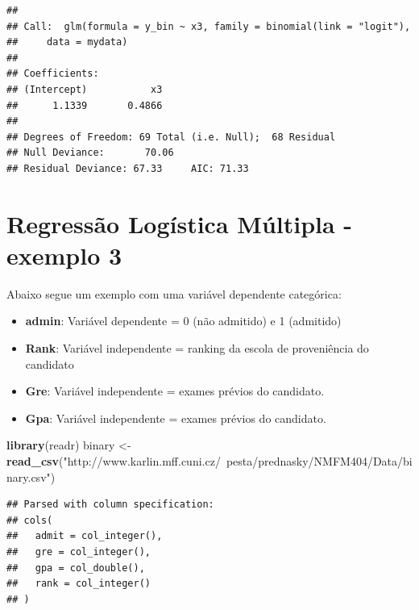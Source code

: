 \documentclass[12pt,brazil,]{book}
\newenvironment{Shaded}{\begin{snugshade}}{\end{snugshade}}
\newcommand{\DataTypeTok}[1]{\textcolor[rgb]{0.13,0.29,0.53}{#1}}
\newcommand{\KeywordTok}[1]{\textcolor[rgb]{0.13,0.29,0.53}{\textbf{#1}}}
\newcommand{\NormalTok}[1]{#1}
\newcommand{\OperatorTok}[1]{\textcolor[rgb]{0.81,0.36,0.00}{\textbf{#1}}}
\newcommand{\StringTok}[1]{\textcolor[rgb]{0.31,0.60,0.02}{#1}}
\providecommand{\tightlist}{%
  \setlength{\itemsep}{0pt}\setlength{\parskip}{0pt}}
\begin{document}
\begin{verbatim}
## 
## Call:  glm(formula = y_bin ~ x3, family = binomial(link = "logit"), 
##     data = mydata)
## 
## Coefficients:
## (Intercept)           x3  
##      1.1339       0.4866  
## 
## Degrees of Freedom: 69 Total (i.e. Null);  68 Residual
## Null Deviance:       70.06 
## Residual Deviance: 67.33     AIC: 71.33
\end{verbatim}

\hypertarget{regressao-logistica-multipla---exemplo-3}{%
\section{Regressão Logística Múltipla - exemplo
3}\label{regressao-logistica-multipla---exemplo-3}}

Abaixo segue um exemplo com uma variável dependente categórica:

\begin{itemize}
\tightlist
\item
  \textbf{admin}: Variável dependente = 0 (não admitido) e 1 (admitido)
\item
  \textbf{Rank}: Variável independente = ranking da escola de
  proveniência do candidato
\item
  \textbf{Gre}: Variável independente = exames prévios do candidato.
\item
  \textbf{Gpa}: Variável independente = exames prévios do candidato.
\end{itemize}

\begin{Shaded}
\begin{Highlighting}[]
\KeywordTok{library}\NormalTok{(readr)}
\NormalTok{binary <-}\StringTok{ }\KeywordTok{read_csv}\NormalTok{(}\StringTok{"http://www.karlin.mff.cuni.cz/~pesta/prednasky/NMFM404/Data/binary.csv"}\NormalTok{)}
\end{Highlighting}
\end{Shaded}

\begin{verbatim}
## Parsed with column specification:
## cols(
##   admit = col_integer(),
##   gre = col_integer(),
##   gpa = col_double(),
##   rank = col_integer()
## )
\end{verbatim}

\begin{Shaded}
\end{Shaded}
\end{document}

